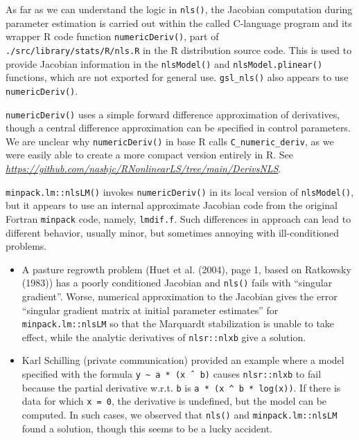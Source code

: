 As far as we can understand the logic in \texttt{nls()}, the Jacobian computation during
parameter estimation is carried out within the called C-language program
and its wrapper R code function \texttt{numericDeriv()}, part of
\texttt{./src/library/stats/R/nls.R}
in the R distribution source code. This is used to provide Jacobian information in
the \texttt{nlsModel()} and \texttt{nlsModel.plinear()} functions, which are not exported for
general use. \texttt{gsl\_nls()} also appears to use \texttt{numericDeriv()}.

\texttt{numericDeriv()} uses a
simple forward difference approximation of derivatives, though a central
difference approximation can be specified in control parameters.
We are unclear why \texttt{numericDeriv()} in base R calls \texttt{C\_numeric\_deriv},
as we were easily able to create a more compact version entirely in R.
See \emph{\url{https://github.com/nashjc/RNonlinearLS/tree/main/DerivsNLS}}.

\texttt{minpack.lm::nlsLM()} invokes \texttt{numericDeriv()} in its local
version of \texttt{nlsModel()}, but it appears to use an internal approximate Jacobian
code from
the original Fortran \texttt{minpack} code, namely, \texttt{lmdif.f}. Such differences in approach
can lead to different behavior, usually minor, but sometimes annoying with
ill-conditioned problems.

\begin{itemize}
\item
  A pasture regrowth problem (Huet et al. (2004), page 1, based on Ratkowsky (1983)) has a
  poorly conditioned Jacobian and \texttt{nls()} fails with ``singular gradient''.
  Worse, numerical approximation to the Jacobian gives the error
  ``singular gradient matrix at initial parameter estimates'' for \texttt{minpack.lm::nlsLM}
  so that the Marquardt stabilization is unable to take effect, while the analytic
  derivatives of \texttt{nlsr::nlxb} give a solution.
\item
  Karl Schilling (private communication) provided an example where a model specified
  with the formula \texttt{y\ \textasciitilde{}\ a\ *\ (x\ ˆ\ b)} causes \texttt{nlsr::nlxb} to fail because the partial
  derivative w.r.t. \texttt{b} is \texttt{a\ *\ (x\ \^{}\ b\ *\ log(x))}. If there is data for which \texttt{x\ =\ 0},
  the derivative is undefined, but the model can be computed. In such cases,
  we observed that \texttt{nls()} and
  \texttt{minpack.lm::nlsLM} found a solution, though this seems to be a lucky accident.
\end{itemize}

